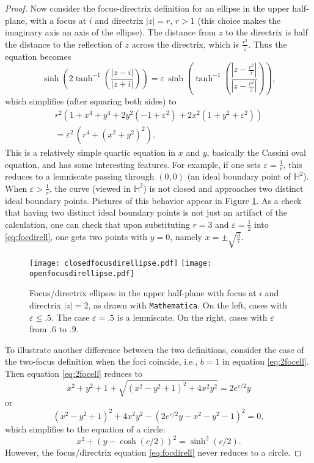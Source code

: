 \documentclass[12pt]{amsart}
\theoremstyle{definition}
\begin{document}
\begin{proof}
Now consider the focus-directrix definition for an ellipse in the
upper half-plane, with a focus at $i$ and directrix $|z|=r$, $r>1$ (this
choice makes the imaginary axis an axis of the ellipse).  The distance
from $z$ to the directrix is half the distance to the reflection of
$z$ across the directrix, which is $\frac{r^2}{\overline z}$.  Thus
the equation becomes
\[
\sinh\left(2\tanh^{-1}\left({\frac{|z-i|}{|z+i|}}\right)\right)
=\varepsilon\,\sinh \left(\tanh^{-1}
\left(\frac{\left\vert z-\frac{r^2}{\overline z}\right\vert}
  {\left\vert z-\frac{r^2}{z}\right\vert}\right)\right),
\]
which simplifies (after squaring both sides) to
\begin{multline}
\label{eq:focdirell}
r^2 \left(1 + x^4 + y^4 + 2 y^2 \left(-1 + \varepsilon^2\right) + 
    2 x^2 \left(1 + y^2 + \varepsilon^2\right)\right) \\=
    \varepsilon^2\,     \left(r^4 + \left(x^2 + 
      y^2\right)^2\right).
\end{multline}
This is a relatively simple quartic equation in $x$ and $y$, basically
the Cassini oval equation, and has
some interesting features.  For example, if one sets
$\varepsilon=\frac{1}{r}$, this reduces to a lemniscate passing
through $(0,0)$ (an ideal boundary point of ${\mathbb H}^2$).  When
$\varepsilon > \frac{1}{r}$, the curve (viewed in ${\mathbb H}^2$) is not
closed and approaches two distinct ideal boundary points.
Pictures of this behavior appear in Figure \ref{fig:focdirell}.
As a check that having two distinct ideal boundary points is not just
an artifact of the calculation,
one can check that upon substituting $r=3$ and $\varepsilon =
\frac12$ into \eqref{eq:focdirell}, one gets two points with $y=0$,
namely $x=\pm \sqrt{\frac37}$.

\begin{figure}
\begin{center}
  \texttt{[image: closedfocusdirellipse.pdf]}\qquad\qquad
  \texttt{[image: openfocusdirellipse.pdf]}
\end{center}
\caption{Focus/directrix ellipses in the upper half-plane with focus at $i$
  and directrix $|z|=2$, as drawn with \texttt{Mathematica}.  On the
  left, cases with $\varepsilon \le 
  .5$. The case $\varepsilon =.5$ is a lemniscate.  On the right,
  cases with $\varepsilon$ from $.6$ to $.9$.}
\label{fig:focdirell}
\end{figure}

To illustrate another difference between the two definitions, consider the
case of the two-focus definition
when the foci coincide, i.e., $b=1$ in equation
\eqref{eq:2focell}.  Then equation \eqref{eq:2focell} reduces to
\[
x^2+y^2+1+\sqrt{(x^2 - y^2 + 1)^2 + 4 x^2 y^2}= 2e^{c/2}y
\]
or
\[
(x^2 - y^2 + 1)^2 + 4 x^2 y^2 - (2e^{c/2}y-x^2-y^2-1)^2 = 0,
\]
which simplifies to the equation of a circle:
\begin{equation}
x^2+\left(y-\cosh(c/2)\right)^2 = \sinh^2(c/2).
\label{eq:2foccirc}
\end{equation}
However, the focus/directrix equation \eqref{eq:focdirell} never
reduces to a circle.


\end{proof}
\end{document}
